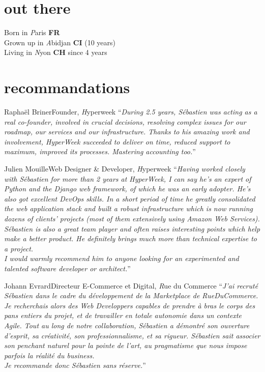 \documentclass[]{friggeri}
\begin{document}
\section{out there}

{\FA \faMapMarker} Born in {\emph Paris} {\bf FR}\\
{\FA \faPlane} Grown up in {\emph Abidjan} {\bf CI} (10 years)\\
{\FA \faPlane} Living in {\emph Nyon} {\bf CH} since 4 years

\clearpage

\section{recommandations}

\begin{quoting}{Raphaël Briner}{Founder, {\emph Hyperweek}}
``\textit{During 2.5 years, Sébastien was acting as a real co-founder,
involved in crucial decisions, resolving complex issues for our roadmap, our
services and our infrastructure. Thanks to his amazing work and involvement,
HyperWeek succeeded to deliver on time, reduced support to maximum, improved
its processes. Mastering accounting too.}''
\end{quoting}

\begin{quoting}{Julien Mouille}{Web Designer \& Developer, {\emph Hyperweek}}
``\textit{Having worked closely with Sébastien for more than 2 years at
HyperWeek, I can say he's an expert of Python and the Django web framework, of
which he was an early adopter. He's also got excellent DevOps skills. In a
short period of time he greatly consolidated the web application stack and
built a robust infrastructure which is now running dozens of clients' projects
(most of them extensively using Amazon Web Services).\\
Sébastien is also a great team player and often raises interesting points
which help make a better product. He definitely brings much more than
technical expertise to a project.\\
I would warmly recommend him to anyone looking for an experimented and
talented software developer or architect.}''
\end{quoting}

\begin{quoting}{Johann Evrard}{Directeur E-Commerce et Digital, {\emph Rue du Commerce}}
``\textit{J'ai recruté Sébastien dans le cadre du développement de la
Marketplace de RueDuCommerce. Je recherchais alors des Web Developpers
capables de prendre à bras le corps des pans entiers du projet, et de
travailler en totale autonomie dans un contexte Agile.
Tout au long de notre collaboration, Sébastien a démontré son ouverture
d'esprit, sa créativité, son professionnalisme, et sa rigueur. Sébastien sait
associer son penchant naturel pour la pointe de l'art, au pragmatisme que nous
impose parfois la réalité du business.\\
Je recommande donc Sébastien sans réserve.}''
\end{quoting}
\end{document}
